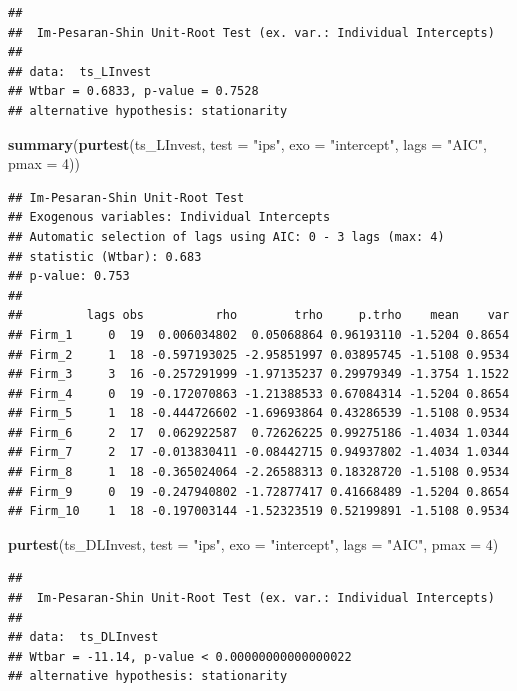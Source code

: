 \documentclass[
]{book}
\newenvironment{Shaded}{\begin{snugshade}}{\end{snugshade}}
\newcommand{\AttributeTok}[1]{\textcolor[rgb]{0.13,0.29,0.53}{#1}}
\newcommand{\DecValTok}[1]{\textcolor[rgb]{0.00,0.00,0.81}{#1}}
\newcommand{\FunctionTok}[1]{\textcolor[rgb]{0.13,0.29,0.53}{\textbf{#1}}}
\newcommand{\NormalTok}[1]{#1}
\newcommand{\StringTok}[1]{\textcolor[rgb]{0.31,0.60,0.02}{#1}}
\begin{document}
\begin{verbatim}
## 
##  Im-Pesaran-Shin Unit-Root Test (ex. var.: Individual Intercepts)
## 
## data:  ts_LInvest
## Wtbar = 0.6833, p-value = 0.7528
## alternative hypothesis: stationarity
\end{verbatim}

\begin{Shaded}
\begin{Highlighting}[]
\FunctionTok{summary}\NormalTok{(}\FunctionTok{purtest}\NormalTok{(ts\_LInvest, }\AttributeTok{test =} \StringTok{"ips"}\NormalTok{, }\AttributeTok{exo =} \StringTok{"intercept"}\NormalTok{, }
                \AttributeTok{lags =} \StringTok{"AIC"}\NormalTok{, }\AttributeTok{pmax =} \DecValTok{4}\NormalTok{))}
\end{Highlighting}
\end{Shaded}

\begin{verbatim}
## Im-Pesaran-Shin Unit-Root Test 
## Exogenous variables: Individual Intercepts 
## Automatic selection of lags using AIC: 0 - 3 lags (max: 4)
## statistic (Wtbar): 0.683 
## p-value: 0.753 
## 
##         lags obs          rho        trho     p.trho    mean    var
## Firm_1     0  19  0.006034802  0.05068864 0.96193110 -1.5204 0.8654
## Firm_2     1  18 -0.597193025 -2.95851997 0.03895745 -1.5108 0.9534
## Firm_3     3  16 -0.257291999 -1.97135237 0.29979349 -1.3754 1.1522
## Firm_4     0  19 -0.172070863 -1.21388533 0.67084314 -1.5204 0.8654
## Firm_5     1  18 -0.444726602 -1.69693864 0.43286539 -1.5108 0.9534
## Firm_6     2  17  0.062922587  0.72626225 0.99275186 -1.4034 1.0344
## Firm_7     2  17 -0.013830411 -0.08442715 0.94937802 -1.4034 1.0344
## Firm_8     1  18 -0.365024064 -2.26588313 0.18328720 -1.5108 0.9534
## Firm_9     0  19 -0.247940802 -1.72877417 0.41668489 -1.5204 0.8654
## Firm_10    1  18 -0.197003144 -1.52323519 0.52199891 -1.5108 0.9534
\end{verbatim}

\begin{Shaded}
\begin{Highlighting}[]
\FunctionTok{purtest}\NormalTok{(ts\_DLInvest, }\AttributeTok{test =} \StringTok{"ips"}\NormalTok{, }\AttributeTok{exo =} \StringTok{"intercept"}\NormalTok{, }
        \AttributeTok{lags =} \StringTok{"AIC"}\NormalTok{, }\AttributeTok{pmax =} \DecValTok{4}\NormalTok{)}
\end{Highlighting}
\end{Shaded}

\begin{verbatim}
## 
##  Im-Pesaran-Shin Unit-Root Test (ex. var.: Individual Intercepts)
## 
## data:  ts_DLInvest
## Wtbar = -11.14, p-value < 0.00000000000000022
## alternative hypothesis: stationarity
\end{verbatim}
\end{document}
